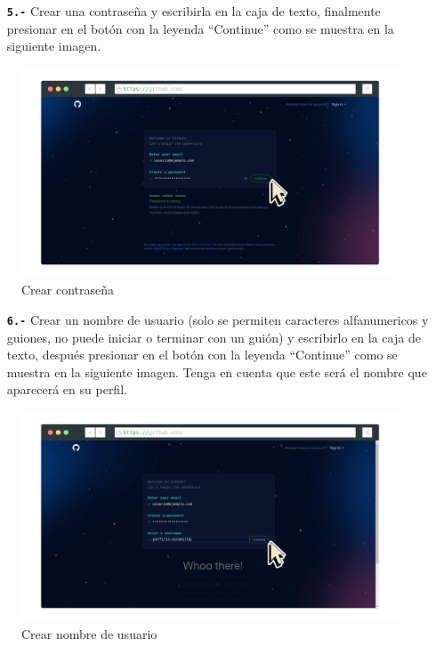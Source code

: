 \begin{itemize}
    \item[\textbf{\texttt{5.-}}] Crear una contraseña y escribirla en la caja de texto, finalmente presionar en el botón con la leyenda ``Continue'' como se muestra en la siguiente imagen.
\end{itemize}
\begin{figure}[H]
    \centering
    \includegraphics[width=\paperwidth-12cm]{screenshot-rocks-GitHub-Password-cursor.png}
    \caption{Crear contraseña}
\end{figure}
\begin{itemize}
    \item[\textbf{\texttt{6.-}}] Crear un nombre de usuario (solo se permiten caracteres alfanumericos y guiones, no puede iniciar o terminar con un guión) y escribirlo en la caja de texto, después presionar en el botón con la leyenda ``Continue'' como se muestra en la siguiente imagen. Tenga en cuenta que este será el nombre que aparecerá en su perfil.
\end{itemize}
\begin{figure}[H]
    \centering
    \includegraphics[width=\paperwidth-12cm]{screenshot-rocks-Username-cursor.png}
    \caption{Crear nombre de usuario}
\end{figure}

